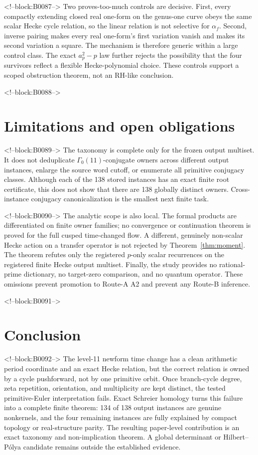 \documentclass[11pt]{article}
\theoremstyle{definition}
\theoremstyle{remark}
\newcommand{\G}{\Gamma_0(11)}
\begin{document}
<!--block:B0087-->
Two proves-too-much controls are decisive. First, every compactly extending closed real one-form on the genus-one curve obeys the same scalar Hecke cycle relation, so the linear relation is not selective for $\alpha_f$. Second, inverse pairing makes every real one-form's first variation vanish and makes its second variation a square. The mechanism is therefore generic within a large control class. The exact $a_p^2-p$ law further rejects the possibility that the four survivors reflect a flexible Hecke-polynomial choice. These controls support a scoped obstruction theorem, not an RH-like conclusion.

<!--block:B0088-->
\section{Limitations and open obligations}

<!--block:B0089-->
The taxonomy is complete only for the frozen output multiset. It does not deduplicate $\G$-conjugate owners across different output instances, enlarge the source word cutoff, or enumerate all primitive conjugacy classes. Although each of the 138 stored instances has an exact finite root certificate, this does not show that there are 138 globally distinct owners. Cross-instance conjugacy canonicalization is the smallest next finite task.

<!--block:B0090-->
The analytic scope is also local. The formal products are differentiated on finite owner families; no convergence or continuation theorem is proved for the full cusped time-changed flow. A different, genuinely non-scalar Hecke action on a transfer operator is not rejected by Theorem~\ref{thm:moment}. The theorem refutes only the registered $p$-only scalar recurrences on the registered finite Hecke output multiset. Finally, the study provides no rational-prime dictionary, no target-zero comparison, and no quantum operator. These omissions prevent promotion to Route-A A2 and prevent any Route-B inference.

<!--block:B0091-->
\section{Conclusion}

<!--block:B0092-->
The level-11 newform time change has a clean arithmetic period coordinate and an exact Hecke relation, but the correct relation is owned by a cycle pushforward, not by one primitive orbit. Once branch-cycle degree, zeta repetition, orientation, and multiplicity are kept distinct, the tested primitive-Euler interpretation fails. Exact Schreier homology turns this failure into a complete finite theorem: 134 of 138 output instances are genuine nonkernels, and the four remaining instances are fully explained by compact topology or real-structure parity. The resulting paper-level contribution is an exact taxonomy and non-implication theorem. A global determinant or Hilbert--Pólya candidate remains outside the established evidence.
\end{document}
